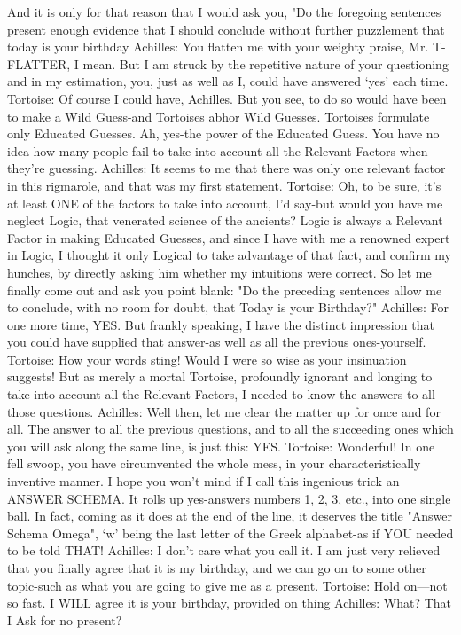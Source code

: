 And it is only for that reason that I would ask you, "Do the foregoing sentences present
   enough evidence that I should conclude without further puzzlement that today is your
   birthday
Achilles: You flatten me with your weighty praise, Mr. T-FLATTER, I mean. But I am
   struck by the repetitive nature of your questioning and in my estimation, you, just as
   well as I, could have answered `yes' each time.
Tortoise: Of course I could have, Achilles. But you see, to do so would have been to
   make a Wild Guess-and Tortoises abhor Wild Guesses. Tortoises formulate only
   Educated Guesses. Ah, yes-the power of the Educated Guess. You have no idea how
   many people fail to take into account all the Relevant Factors when they're guessing.
Achilles: It seems to me that there was only one relevant factor in this rigmarole, and that
   was my first statement.
Tortoise: Oh, to be sure, it's at least ONE of the factors to take into account, I'd say-but
   would you have me neglect Logic, that venerated science of the ancients? Logic is
   always a Relevant Factor in making Educated Guesses, and since I have with me a
   renowned expert in Logic, I thought it only Logical to take advantage of that fact, and
   confirm my hunches, by directly asking him whether my intuitions were correct. So
   let me finally come out and ask you point blank: "Do the preceding sentences allow
   me to conclude, with no room for doubt, that Today is your Birthday?"
Achilles: For one more time, YES. But frankly speaking, I have the distinct impression
   that you could have supplied that answer-as well as all the previous ones-yourself.
Tortoise: How your words sting! Would I were so wise as your insinuation suggests! But
   as merely a mortal Tortoise, profoundly ignorant and longing to take into account all
   the Relevant Factors, I needed to know the answers to all those questions.
Achilles: Well then, let me clear the matter up for once and for all. The answer to all the
   previous questions, and to all the succeeding ones which you will ask along the same
   line, is just this: YES.
Tortoise: Wonderful! In one fell swoop, you have circumvented the whole mess, in your
   characteristically inventive manner. I hope you won't mind if I call this ingenious
   trick an ANSWER SCHEMA. It rolls up yes-answers numbers 1, 2, 3, etc., into one
   single ball. In fact, coming as it does at the end of the line, it deserves the title
   "Answer Schema Omega", `w' being the last letter of the Greek alphabet-as if YOU
   needed to be told THAT!
Achilles: I don't care what you call it. I am just very relieved that you finally agree that it
   is my birthday, and we can go on to some other topic-such as what you are going to
   give me as a present.
Tortoise: Hold on—not so fast. I WILL agree it is your birthday, provided on thing
Achilles: What? That I Ask for no present?




